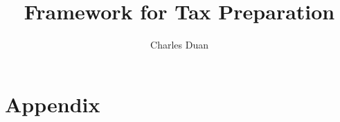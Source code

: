 \documentclass[12pt]{article}
\title{Framework for Tax Preparation}
\author{Charles Duan}
\begin{document}
\maketitle

\tableofcontents















\appendix

\part*{Appendix}




\end{document}
